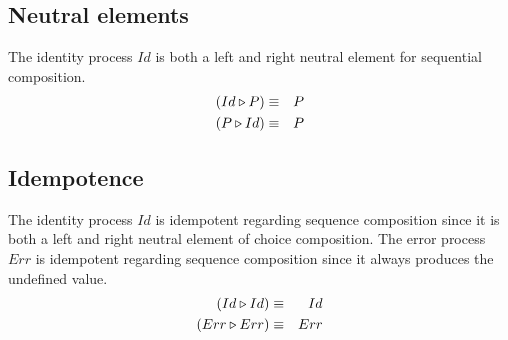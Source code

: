 \subsection{Neutral elements}
The identity process $Id$ is both a left and right neutral element for sequential composition.
\begin{eqnarray*}
  \left( Id \triangleright P \right) & \equiv & P \\
  \left( P \triangleright Id \right) & \equiv & P
\end{eqnarray*}

\subsection{Idempotence}
The identity process $Id$ is idempotent regarding sequence composition since it is both a left and right neutral element of choice composition. The error process $Err$ is idempotent regarding sequence composition since it always produces the undefined value.
\begin{eqnarray*}
  \left( Id \triangleright Id \right) & \equiv & Id \\
  \left( Err \triangleright Err \right) & \equiv & Err \\
\end{eqnarray*}